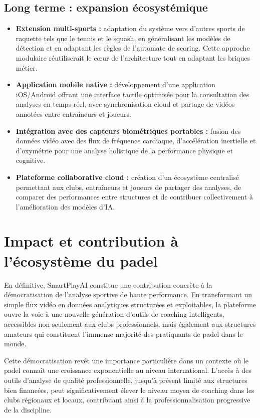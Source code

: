 \subsection*{Long terme : expansion écosystémique}

\begin{itemize}
    \item \textbf{Extension multi-sports :} adaptation du système vers d'autres sports de raquette tels que le tennis et le squash, en généralisant les modèles de détection et en adaptant les règles de l'automate de scoring. Cette approche modulaire réutiliserait le cœur de l'architecture tout en adaptant les briques métier.
    \item \textbf{Application mobile native :} développement d'une application iOS/Android offrant une interface tactile optimisée pour la consultation des analyses en temps réel, avec synchronisation cloud et partage de vidéos annotées entre entraîneurs et joueurs.
    \item \textbf{Intégration avec des capteurs biométriques portables :} fusion des données vidéo avec des flux de fréquence cardiaque, d'accélération inertielle et d'oxymétrie pour une analyse holistique de la performance physique et cognitive.
    \item \textbf{Plateforme collaborative cloud :} création d'un écosystème centralisé permettant aux clubs, entraîneurs et joueurs de partager des analyses, de comparer des performances entre structures et de contribuer collectivement à l'amélioration des modèles d'IA.
\end{itemize}

\section*{Impact et contribution à l'écosystème du padel}

En définitive, SmartPlayAI constitue une contribution concrète à la démocratisation de l'analyse sportive de haute performance. En transformant un simple flux vidéo en données analytiques structurées et exploitables, la plateforme ouvre la voie à une nouvelle génération d'outils de coaching intelligents, accessibles non seulement aux clubs professionnels, mais également aux structures amateurs qui constituent l'immense majorité des pratiquants de padel dans le monde.

Cette démocratisation revêt une importance particulière dans un contexte où le padel connaît une croissance exponentielle au niveau international. L'accès à des outils d'analyse de qualité professionnelle, jusqu'à présent limité aux structures bien financées, peut significativement élever le niveau moyen de coaching dans les clubs régionaux et locaux, contribuant ainsi à la professionnalisation progressive de la discipline.

